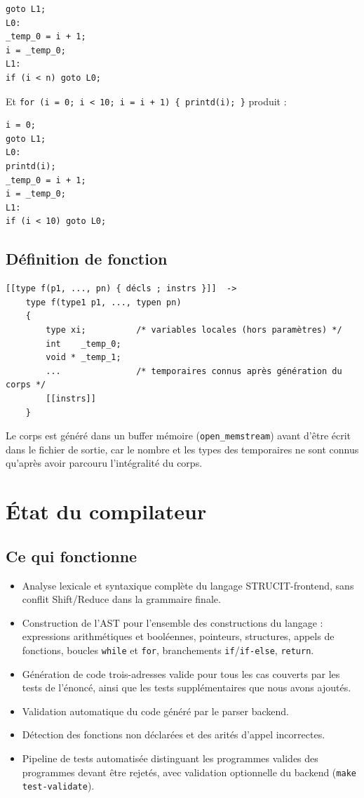 \documentclass[12pt,a4paper]{article}
\begin{document}
\begin{lstlisting}
goto L1;
L0:
_temp_0 = i + 1;
i = _temp_0;
L1:
if (i < n) goto L0;
\end{lstlisting}

Et \texttt{for (i = 0; i < 10; i = i + 1) \{ printd(i); \}} produit :

\begin{lstlisting}
i = 0;
goto L1;
L0:
printd(i);
_temp_0 = i + 1;
i = _temp_0;
L1:
if (i < 10) goto L0;
\end{lstlisting}

\subsection{Définition de fonction}

\begin{lstlisting}
[[type f(p1, ..., pn) { décls ; instrs }]]  ->
    type f(type1 p1, ..., typen pn)
    {
        type xi;          /* variables locales (hors paramètres) */
        int    _temp_0;
        void * _temp_1;
        ...               /* temporaires connus après génération du corps */
        [[instrs]]
    }
\end{lstlisting}

Le corps est généré dans un buffer mémoire (\texttt{open\_memstream}) avant d'être écrit dans le fichier de sortie, car le nombre et les types des temporaires ne sont connus qu'après avoir parcouru l'intégralité du corps.

\section{État du compilateur}

\subsection{Ce qui fonctionne}

\begin{itemize}
  \item Analyse lexicale et syntaxique complète du langage STRUCIT-frontend, sans conflit Shift/Reduce dans la grammaire finale.
  \item Construction de l'AST pour l'ensemble des constructions du langage : expressions arithmétiques et booléennes, pointeurs, structures, appels de fonctions, boucles \texttt{while} et \texttt{for}, branchements \texttt{if}/\texttt{if-else}, \texttt{return}.
  \item Génération de code trois-adresses valide pour tous les cas couverts par les tests de l'énoncé, ainsi que les tests supplémentaires que nous avons ajoutés.
  \item Validation automatique du code généré par le parser backend.
  \item Détection des fonctions non déclarées et des arités d'appel incorrectes.
  \item Pipeline de tests automatisée distinguant les programmes valides des programmes devant être rejetés, avec validation optionnelle du backend (\texttt{make test-validate}).
\end{itemize}
\end{document}
